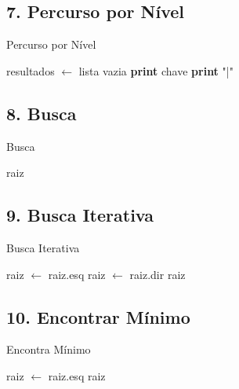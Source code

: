\documentclass[a4paper,12pt]{article}
\begin{document}
\subsection*{7. Percurso por Nível}
\begin{algorithm}[H][H]
\caption{Percurso por Nível}
\begin{algorithmic}[1]
    \State resultados $\gets$ lista vazia
    \State {}
            \State \textbf{print} chave
        \EndFor
        \State \textbf{print} "|"
    \EndFor
\EndFunction
\end{algorithmic}
\end{algorithm}

\subsection*{8. Busca}
\begin{algorithm}[H]
\caption{Busca}
\begin{algorithmic}[1]
        \State \Return raiz
        \State \Return {}
    \Else
        \State \Return {}
    \EndIf
\EndFunction
\end{algorithmic}
\end{algorithm}

\subsection*{9. Busca Iterativa}
\begin{algorithm}[H]
\caption{Busca Iterativa}
\begin{algorithmic}[1]
            \State raiz $\gets$ raiz.esq
        \Else
            \State raiz $\gets$ raiz.dir
        \EndIf
    \EndWhile
    \State \Return raiz
\EndFunction
\end{algorithmic}
\end{algorithm}

\subsection*{10. Encontrar Mínimo}
\begin{algorithm}[H]
\caption{Encontra Mínimo}
\begin{algorithmic}[1]
        \State raiz $\gets$ raiz.esq
    \EndWhile
    \State \Return raiz
\EndFunction
\end{algorithmic}
\end{algorithm}
\end{document}

